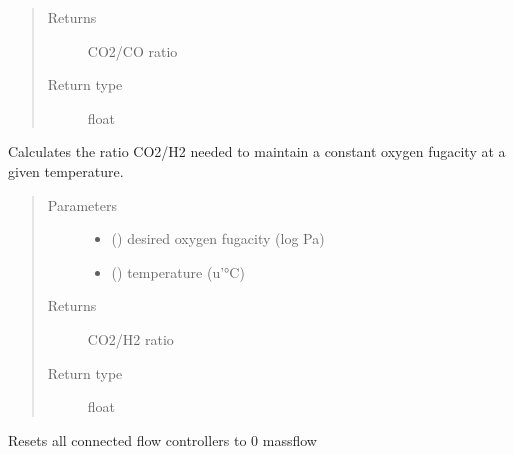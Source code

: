 \documentclass[letterpaper,10pt,english]{sphinxmanual}
\begin{document}
\begin{fulllineitems}
\begin{fulllineitems}
\begin{quote}
\begin{description}
\begin{itemize}
\end{itemize}

\item[{Returns}] \leavevmode
CO2/CO ratio

\item[{Return type}] \leavevmode
float

\end{description}\end{quote}

\end{fulllineitems}


\begin{fulllineitems}
\label{\detokenize{source/laboratory.drivers:laboratory.drivers.mfc.MFC.fugacity_h2}}
Calculates the ratio CO2/H2 needed to maintain a constant oxygen fugacity at a given temperature.
\begin{quote}\begin{description}
\item[{Parameters}] \leavevmode\begin{itemize}
\item {} 
 (\sphinxstyleliteralemphasis{\sphinxupquote{, }}) \textendash{} desired oxygen fugacity (log Pa)

\item {} 
 (\sphinxstyleliteralemphasis{\sphinxupquote{, }}) \textendash{} temperature (u’°C)

\end{itemize}

\item[{Returns}] \leavevmode
CO2/H2 ratio

\item[{Return type}] \leavevmode
float

\end{description}\end{quote}

\end{fulllineitems}


\begin{fulllineitems}
\label{\detokenize{source/laboratory.drivers:laboratory.drivers.mfc.MFC.reset}}
Resets all connected flow controllers to 0 massflow

\end{fulllineitems}


\end{fulllineitems}
\end{document}
